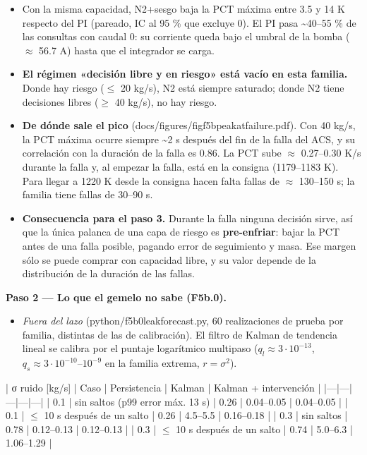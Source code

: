 \documentclass[11pt,a4paper]{article}
\newcommand{\codeus}{\textunderscore\allowbreak}
\newcommand{\code}[1]{{\small\ttfamily\let\_\codeus #1}}
\begin{document}
\begin{itemize}
\item Con la misma capacidad, N2+sesgo baja la PCT máxima entre 3.5 y 14 K respecto del PI (pareado, IC al 95 \% que excluye 0). El PI pasa \textasciitilde{}40–55 \% de las consultas con caudal 0: su corriente queda bajo el umbral de la bomba ($\approx$ 56.7 A) hasta que el integrador se carga.
\item \textbf{El régimen «decisión libre y en riesgo» está vacío en esta familia.} Donde hay riesgo ($\le$ 20 kg/s), N2 está siempre saturado; donde N2 tiene decisiones libres ($\ge$ 40 kg/s), no hay riesgo.
\item \textbf{De dónde sale el pico} (\code{docs/figures/fig\_f5b\_peak\_at\_failure.pdf}). Con 40 kg/s, la PCT máxima ocurre siempre \textasciitilde{}2 s después del fin de la falla del ACS, y su correlación con la duración de la falla es 0.86. La PCT sube $\approx$ 0.27–0.30 K/s durante la falla y, al empezar la falla, está en la consigna (1179–1183 K). Para llegar a 1220 K desde la consigna hacen falta fallas de $\approx$ 130–150 s; la familia tiene fallas de 30–90 s.
\item \textbf{Consecuencia para el paso 3.} Durante la falla ninguna decisión sirve, así que la única palanca de una capa de riesgo es \textbf{pre-enfriar}: bajar la PCT antes de una falla posible, pagando error de seguimiento y masa. Ese margen sólo se puede comprar con capacidad libre, y su valor depende de la distribución de la duración de las fallas.
\end{itemize}

\textbf{Paso 2 — Lo que el gemelo no sabe (F5b.0).}

\begin{itemize}
\item \emph{Fuera del lazo} (\code{python/f5b0\_leak\_forecast.py}, 60 realizaciones de prueba por familia, distintas de las de calibración). El filtro de Kalman de tendencia lineal se calibra por el puntaje logarítmico multipaso ($q_l\approx3\cdot10^{-13}$, $q_s\approx3\cdot10^{-10}$–$10^{-9}$ en la familia extrema, $r=\sigma^2$).
\end{itemize}

| σ ruido [kg/s] | Caso | Persistencia | Kalman | Kalman + intervención | |---|---|---|---|---| | 0.1 | sin saltos (p99 error máx. 13 s) | 0.26 | 0.04–0.05 | 0.04–0.05 | | 0.1 | $\le$ 10 s después de un salto | 0.26 | 4.5–5.5 | 0.16–0.18 | | 0.3 | sin saltos | 0.78 | 0.12–0.13 | 0.12–0.13 | | 0.3 | $\le$ 10 s después de un salto | 0.74 | 5.0–6.3 | 1.06–1.29 |
\end{document}

